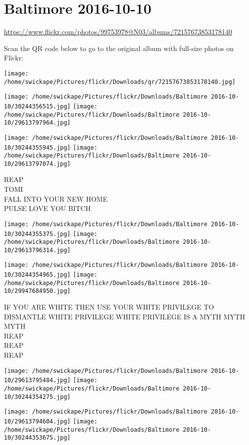 \documentclass[10pt,letterpaper]{article}
\title{}
\author{}
\date{}
\begin{document}
\section*{Baltimore 2016-10-10}

\url{https://www.flickr.com/photos/99753978@N03/albums/72157673853178140}

Scan the QR code below to go to the original album with full-size photos on Flickr:

\texttt{[image: /home/swickape/Pictures/flickr/Downloads/qr/72157673853178140.jpg]}
\pagebreak

\texttt{[image: /home/swickape/Pictures/flickr/Downloads/Baltimore 2016-10-10/30244356515.jpg]}
\texttt{[image: /home/swickape/Pictures/flickr/Downloads/Baltimore 2016-10-10/29613797964.jpg]}

\texttt{[image: /home/swickape/Pictures/flickr/Downloads/Baltimore 2016-10-10/30244355945.jpg]}
\texttt{[image: /home/swickape/Pictures/flickr/Downloads/Baltimore 2016-10-10/29613797074.jpg]}

REAP\\
TOMI\\
FALL INTO YOUR NEW HOME\\
PULSE LOVE YOU BITCH
\pagebreak

\texttt{[image: /home/swickape/Pictures/flickr/Downloads/Baltimore 2016-10-10/30244355375.jpg]}
\texttt{[image: /home/swickape/Pictures/flickr/Downloads/Baltimore 2016-10-10/29613796314.jpg]}

\texttt{[image: /home/swickape/Pictures/flickr/Downloads/Baltimore 2016-10-10/30244354965.jpg]}
\texttt{[image: /home/swickape/Pictures/flickr/Downloads/Baltimore 2016-10-10/29947684950.jpg]}

IF YOU ARE WHITE THEN USE YOUR WHITE PRIVILEGE TO DISMANTLE WHITE PRIVILEGE WHITE PRIVILEGE IS A MYTH MYTH MYTH\\
REAP\\
REAP\\
REAP
\pagebreak

\texttt{[image: /home/swickape/Pictures/flickr/Downloads/Baltimore 2016-10-10/29613795484.jpg]}
\texttt{[image: /home/swickape/Pictures/flickr/Downloads/Baltimore 2016-10-10/30244354275.jpg]}

\texttt{[image: /home/swickape/Pictures/flickr/Downloads/Baltimore 2016-10-10/29613794604.jpg]}
\texttt{[image: /home/swickape/Pictures/flickr/Downloads/Baltimore 2016-10-10/30244353675.jpg]}
\end{document}

